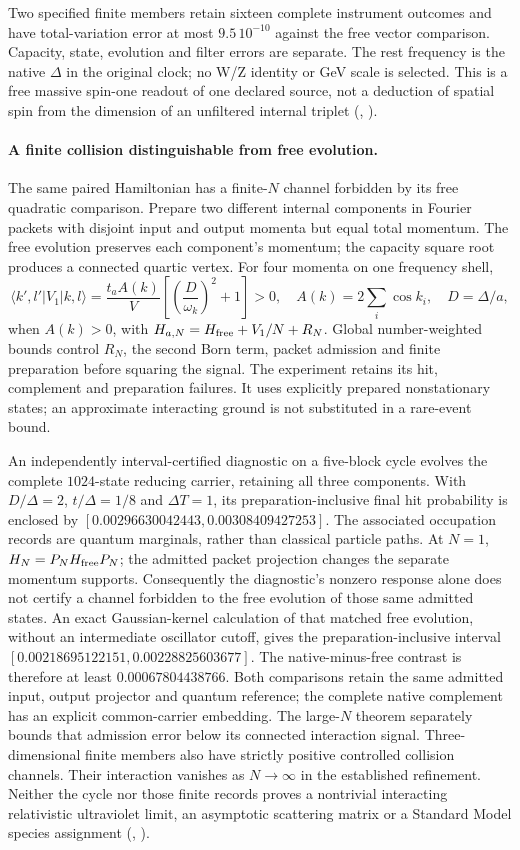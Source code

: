 Two specified finite members retain sixteen complete instrument outcomes
and have total-variation error at most $9.5\,10^{-10}$ against the free
vector comparison. Capacity, state, evolution and filter errors are
separate. The rest frequency is the native $\Delta$ in the original
clock; no W/Z identity or GeV scale is selected. This is a free massive
spin-one readout of one declared source, not a deduction of spatial spin
from the dimension of an unfiltered internal triplet
(, \cite{ophrepo}).

\paragraph{A finite collision distinguishable from free evolution.}
The same paired Hamiltonian has a finite-$N$ channel forbidden by its
free quadratic comparison. Prepare two different internal components
in Fourier packets with disjoint input and output momenta but equal
total momentum. The free evolution preserves each component's momentum;
the capacity square root produces a connected quartic vertex. For four
momenta on one frequency shell,
\[
 \langle k',l'|V_1|k,l\rangle
 =\frac{t_a A(k)}{V}\left[\left(\frac{D}{\omega_k}\right)^2+1\right]>0,
 \quad A(k)=2\sum_i\cos k_i,\quad D=\Delta/a,
\]
when $A(k)>0$, with $H_{a,N}=H_{\rm free}+V_1/N+R_N$.
Global number-weighted bounds control $R_N$, the second Born term,
packet admission and finite preparation before squaring the signal.
The experiment retains its hit, complement and preparation failures.
It uses explicitly prepared nonstationary states; an approximate
interacting ground is not substituted in a rare-event bound.

An independently interval-certified diagnostic on a five-block cycle
evolves the complete $1024$-state reducing carrier, retaining all three
components. With $D/\Delta=2$, $t/\Delta=1/8$ and $\Delta T=1$, its
preparation-inclusive final hit probability is enclosed by
$[0.00296630042443,0.00308409427253]$.
The associated occupation records are quantum marginals, rather than
classical particle paths. At $N=1$, $H_N=P_NH_{\rm free}P_N$;
the admitted packet projection changes the separate momentum supports.
Consequently the diagnostic's nonzero response alone does not certify
a channel forbidden to the free evolution of those same admitted states.
An exact Gaussian-kernel calculation of that matched free evolution,
without an intermediate oscillator cutoff, gives the preparation-inclusive
interval $[0.00218695122151,0.00228825603677]$. The native-minus-free
contrast is therefore at least $0.00067804438766$. Both comparisons retain
the same admitted input, output projector and quantum reference; the
complete native complement has an explicit common-carrier embedding.
The large-$N$ theorem separately bounds that admission error below its
connected interaction signal. Three-dimensional finite members also have
strictly positive controlled collision channels. Their interaction
vanishes as $N\to\infty$ in the established refinement. Neither the
cycle nor those finite records proves a nontrivial interacting
relativistic ultraviolet limit, an asymptotic scattering matrix or a
Standard Model species assignment
(, \cite{ophrepo}).

